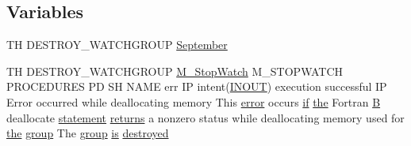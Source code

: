 \subsection*{Variables}
\begin{DoxyCompactItemize}
\item 
TH D\+E\+S\+T\+R\+O\+Y\+\_\+\+W\+A\+T\+C\+H\+G\+R\+O\+UP \hyperlink{destroy__watchgroup_83_8txt_a9282988e24ecf276c933cacbd14ff53b}{September}
\item 
TH D\+E\+S\+T\+R\+O\+Y\+\_\+\+W\+A\+T\+C\+H\+G\+R\+O\+UP \hyperlink{option__stopwatch_83_8txt_aa2011fc45a5e502e87ee50996a8a9305}{M\+\_\+\+Stop\+Watch} M\+\_\+\+S\+T\+O\+P\+W\+A\+T\+CH P\+R\+O\+C\+E\+D\+U\+R\+ES PD SH N\+A\+ME err IP intent(\hyperlink{M__stopwatch_83_8txt_aac11c70dd588f9c3fe71e95dbe89902f}{I\+N\+O\+UT}) execution successful IP Error occurred while deallocating memory This \hyperlink{M__stopwatch_83_8txt_ac4611edff506351be87ddb9adfc62315}{error} occurs \hyperlink{exit_87_8txt_a77395982f8d25581c808c40f3b634d90}{if} \hyperlink{M__stopwatch_83_8txt_a0f266597de2e57eb3aa964927bb30e14}{the} Fortran \hyperlink{intro__blas1_83_8txt_a5f157716d3fd55e7b7e08312dc859b58}{B} deallocate \hyperlink{M__stopwatch_83_8txt_a43758526aa61bbaa49faf1e287658350}{statement} \hyperlink{M__stopwatch_83_8txt_aee54cdd5349bf498aa96e7f9426a0717}{returns} a nonzero status while deallocating memory used for \hyperlink{M__stopwatch_83_8txt_a0f266597de2e57eb3aa964927bb30e14}{the} \hyperlink{M__stopwatch_83_8txt_a80fa32a76a22835e3c85462b2803875c}{group} The \hyperlink{M__stopwatch_83_8txt_a80fa32a76a22835e3c85462b2803875c}{group} \hyperlink{intro__blas1_83_8txt_a42a91df93f840595de3019ceb5d1df23}{is} \hyperlink{destroy__watchgroup_83_8txt_aa8895bfb33bae6c686314ee89dc98fa2}{destroyed}
\item 

\end{DoxyCompactItemize}
